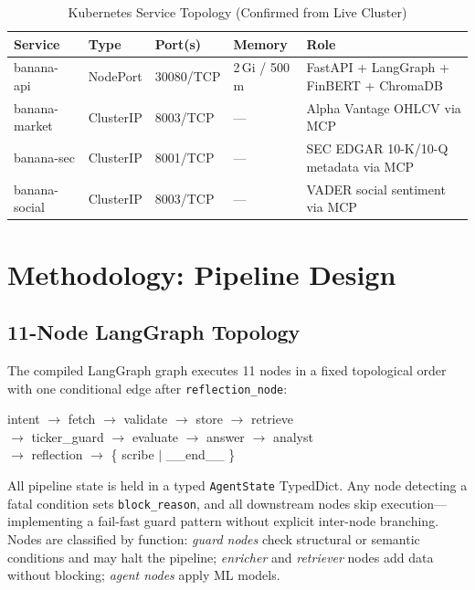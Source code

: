 \documentclass[10pt,twocolumn]{article}
\newcommand{\node}[1]{\texttt{#1}}
\begin{document}
\begin{table}[htbp]
\caption{Kubernetes Service Topology (Confirmed from Live Cluster)}
\label{tab:k8s}
\centering
\small
\begin{tabular}{@{}p{3cm} p{2cm} p{2cm} p{2cm} p{5cm}@{}}
\toprule
\textbf{Service} & \textbf{Type} & \textbf{Port(s)} &
\textbf{Memory} & \textbf{Role} \\
\midrule
banana-api    & NodePort  & 30080/TCP & 2\,Gi / 500\,m & FastAPI + LangGraph + FinBERT + ChromaDB \\
banana-market & ClusterIP & 8003/TCP  & ---            & Alpha Vantage OHLCV via MCP \\
banana-sec    & ClusterIP & 8001/TCP  & ---            & SEC EDGAR 10-K/10-Q metadata via MCP \\
banana-social & ClusterIP & 8003/TCP  & ---            & VADER social sentiment via MCP \\
\bottomrule
\end{tabular}
\end{table}

\section{Methodology: Pipeline Design}
\label{sec:method}

\subsection{11-Node LangGraph Topology}

The compiled LangGraph graph executes 11 nodes in a fixed topological
order with one conditional edge after \node{reflection\_node}:

\begin{mdframed}[backgroundcolor=codebg,linecolor=navyblue,
                 linewidth=0.5pt,topline=false,bottomline=false,
                 leftline=true,rightline=false,innerleftmargin=6pt]
\ttfamily\footnotesize\noindent
intent $\!\to\!$ fetch $\!\to\!$ validate $\!\to\!$ store
$\!\to\!$ retrieve\\
$\to$ ticker\_guard $\!\to\!$ evaluate $\!\to\!$ answer
$\!\to\!$ analyst\\
$\to$ reflection $\!\to\!$ \{ scribe $|$ \_\_end\_\_ \}
\end{mdframed}

\vspace{4pt}

All pipeline state is held in a typed \texttt{AgentState} TypedDict.
Any node detecting a fatal condition sets \texttt{block\_reason}, and
all downstream nodes skip execution---implementing a fail-fast guard
pattern without explicit inter-node branching.
Nodes are classified by function: \emph{guard nodes} check structural
or semantic conditions and may halt the pipeline; \emph{enricher} and
\emph{retriever} nodes add data without blocking; \emph{agent nodes}
apply ML models.
\end{document}
